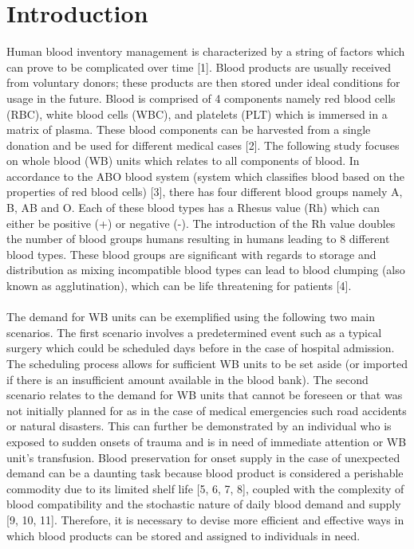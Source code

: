 \documentclass{article}
\begin{document}
\section{Introduction}
Human blood inventory management is characterized by a string of factors which can prove to be complicated over time [1]. Blood products are usually received from voluntary donors; these products are then stored under ideal conditions for usage in the future. Blood is comprised of 4 components namely red blood cells (RBC), white blood cells (WBC), and platelets (PLT) which is immersed in a matrix of plasma. These blood components can be harvested from a single donation and be used for different medical cases [2]. The following study focuses on whole blood (WB) units which relates to all components of blood. In accordance to the ABO blood system (system which classifies blood based on the properties of red blood cells) [3], there has four different blood groups namely A, B, AB and O. Each of these blood types has a Rhesus value (Rh) which can either be positive (+) or negative (-). The introduction of the Rh value doubles the number of blood groups humans resulting in humans leading to 8 different blood types. These blood groups are significant with regards to storage and distribution as mixing incompatible blood types can lead to blood clumping (also known as agglutination), which can be life threatening for patients [4]. \\
\\
The demand for WB units can be exemplified using the following two main scenarios. The first scenario involves a predetermined event such as a typical surgery which could be scheduled days before in the case of hospital admission. The scheduling process allows for sufficient WB units to be set aside (or imported if there is an insufficient amount available in the blood bank). The second scenario relates to the demand for WB units that cannot be foreseen or that was not initially planned for as in the case of medical emergencies such road accidents or natural disasters. This can further be demonstrated by an individual who is exposed to sudden onsets of trauma and is in need of immediate attention or WB unit’s transfusion. Blood preservation for onset supply in the case of unexpected demand can be a daunting task because blood product is considered a perishable commodity due to its limited shelf life [5, 6, 7, 8], coupled with the complexity of blood compatibility and the stochastic nature of daily blood demand and supply [9, 10, 11]. Therefore, it is necessary to devise more efficient and effective ways in which blood products can be stored and assigned to individuals in need. 
\end{document}
